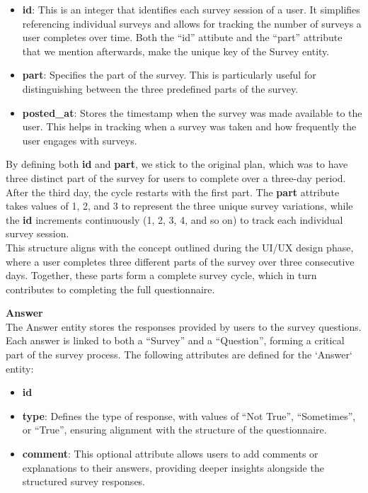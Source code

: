 \begin{itemize}
    \item \textbf{id}: This is an integer that identifies each survey session of a user. It simplifies referencing individual surveys and allows for tracking the number of surveys a user completes over time. Both the ``id'' attibute and the ``part'' attribute that we mention afterwards, make the unique key of the Survey entity.
    \item \textbf{part}: Specifies the part of the survey. This is particularly useful for distinguishing between the three predefined parts of the survey.
    \item \textbf{posted\_at}: Stores the timestamp when the survey was made available to the user. This helps in tracking when a survey was taken and how frequently the user engages with surveys.
\end{itemize}

\noindent By defining both \textbf{id} and \textbf{part}, we stick to the original plan, which was to have three distinct part of the survey for users to complete over a three-day period. After the third day, the cycle restarts with the first part. The \textbf{part} attribute takes values of 1, 2, and 3 to represent the three unique survey variations, while the \textbf{id} increments continuously (1, 2, 3, 4, and so on) to track each individual survey session.\vspace{5mm} \\
This structure aligns with the concept outlined during the UI/UX design phase, where a user completes three different parts of the survey over three consecutive days. Together, these parts form a complete survey cycle, which in turn contributes to completing the full questionnaire.

\vspace{5mm}

\noindent \textbf{Answer} \\
The Answer entity stores the responses provided by users to the survey questions. Each answer is linked to both a ``Survey'' and a ``Question'', forming a critical part of the survey process. The following attributes are defined for the `Answer` entity:

\begin{itemize}
    \item \textbf{id}
    \item \textbf{type}: Defines the type of response, with values of ``Not True'', ``Sometimes'', or ``True'', ensuring alignment with the structure of the questionnaire.
    \item \textbf{comment}: This optional attribute allows users to add comments or explanations to their answers, providing deeper insights alongside the structured survey responses.
\end{itemize}

